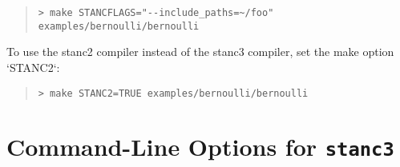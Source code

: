 %
\begin{quote}
\begin{Verbatim}[fontshape=sl]
> make STANCFLAGS="--include_paths=~/foo" examples/bernoulli/bernoulli
\end{Verbatim}
\end{quote}
%

To use the stanc2 compiler instead of the stanc3 compiler,
set the make option `STANC2`:
%
\begin{quote}
\begin{Verbatim}[fontshape=sl]
> make STANC2=TRUE examples/bernoulli/bernoulli
\end{Verbatim}
\end{quote}
%


\section{Command-Line Options for {\tt\bfseries stanc3}}

